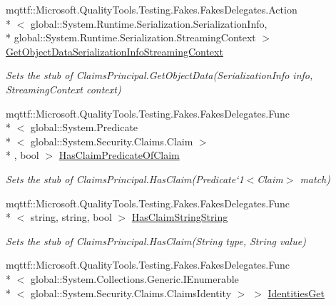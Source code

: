 \begin{DoxyCompactItemize}
mqttf\-::\-Microsoft.\-Quality\-Tools.\-Testing.\-Fakes.\-Fakes\-Delegates.\-Action\\*
$<$ global\-::\-System.\-Runtime.\-Serialization.\-Serialization\-Info, \\*
global\-::\-System.\-Runtime.\-Serialization.\-Streaming\-Context $>$ \hyperlink{class_system_1_1_security_1_1_principal_1_1_fakes_1_1_stub_generic_principal_a6319897ace309bca5103ef69acaf3a8c}{Get\-Object\-Data\-Serialization\-Info\-Streaming\-Context}
\begin{DoxyCompactList}\small\item\em Sets the stub of Claims\-Principal.\-Get\-Object\-Data(\-Serialization\-Info info, Streaming\-Context context)\end{DoxyCompactList}\item 
mqttf\-::\-Microsoft.\-Quality\-Tools.\-Testing.\-Fakes.\-Fakes\-Delegates.\-Func\\*
$<$ global\-::\-System.\-Predicate\\*
$<$ global\-::\-System.\-Security.\-Claims.\-Claim $>$\\*
, bool $>$ \hyperlink{class_system_1_1_security_1_1_principal_1_1_fakes_1_1_stub_generic_principal_a54badf57ba4834742ab3719dc5580ded}{Has\-Claim\-Predicate\-Of\-Claim}
\begin{DoxyCompactList}\small\item\em Sets the stub of Claims\-Principal.\-Has\-Claim(Predicate`1$<$Claim$>$ match)\end{DoxyCompactList}\item 
mqttf\-::\-Microsoft.\-Quality\-Tools.\-Testing.\-Fakes.\-Fakes\-Delegates.\-Func\\*
$<$ string, string, bool $>$ \hyperlink{class_system_1_1_security_1_1_principal_1_1_fakes_1_1_stub_generic_principal_acbe8215662b9d5b35fc52e07841fbbe1}{Has\-Claim\-String\-String}
\begin{DoxyCompactList}\small\item\em Sets the stub of Claims\-Principal.\-Has\-Claim(\-String type, String value)\end{DoxyCompactList}\item 
mqttf\-::\-Microsoft.\-Quality\-Tools.\-Testing.\-Fakes.\-Fakes\-Delegates.\-Func\\*
$<$ global\-::\-System.\-Collections.\-Generic.\-I\-Enumerable\\*
$<$ global\-::\-System.\-Security.\-Claims.\-Claims\-Identity $>$ $>$ \hyperlink{class_system_1_1_security_1_1_principal_1_1_fakes_1_1_stub_generic_principal_afb567fa494044341ff04d24afab54796}{Identities\-Get}

\end{DoxyCompactItemize}
